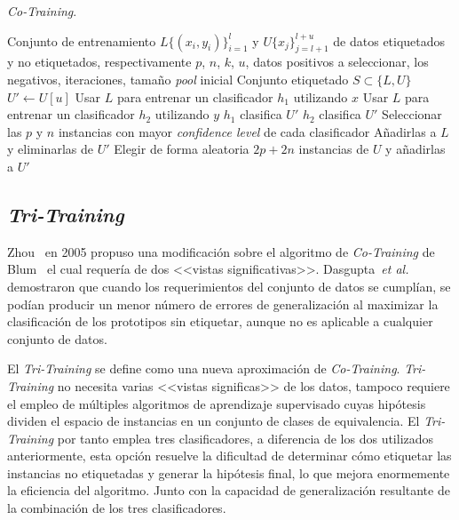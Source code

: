 \begin{algorithm}[H]
\caption{\textit{Co-Training}.}\label{alg:Co-Training}
\begin{algorithmic}[1]
\Require Conjunto de entrenamiento $L \lbrace\left(x_i, y_i\right)\rbrace_{i=1}^l$ y $U \lbrace x_j \rbrace_{j=l+1}^{l+u}$ de datos etiquetados y no etiquetados, respectivamente
\Require $p$, $n$, $k$, $u$, datos positivos a seleccionar, los negativos, iteraciones, tamaño \textit{pool} inicial
\Ensure Conjunto etiquetado $S \subset \lbrace L,U \rbrace$
\Statex
{}
	\State $U' \leftarrow U[u]$
		\State Usar $L$ para entrenar un clasificador $h_1$ utilizando $x$
		\State Usar $L$ para entrenar un clasificador $h_2$ utilizando $y$
		\State $h_1$ clasifica $U'$
		\State $h_2$ clasifica $U'$
		\State Seleccionar las $p$ y $n$ instancias con mayor \textit{confidence level} de cada clasificador
		\State Añadirlas a $L$ y eliminarlas de $U'$
		\State Elegir de forma aleatoria $2p+2n$ instancias de $U$ y añadirlas a $U'$
	\EndFor
\EndProcedure
\end{algorithmic}
\end{algorithm}

\subsection{\textit{Tri-Training}}
Zhou~\cite{zhou2005tri} en 2005 propuso una modificación sobre el algoritmo de \textit{Co-Training} de Blum~\cite{blum1998combining} el cual requería de dos <<vistas significativas>>. Dasgupta~\textit{et al.}~\cite{dasgupta2002pac} demostraron que cuando los requerimientos del conjunto de datos se cumplían, se podían producir un menor número de errores de generalización al maximizar la clasificación de los prototipos sin etiquetar, aunque no es aplicable a cualquier conjunto de datos.

El \textit{Tri-Training} se define como una nueva aproximación de \textit{Co-Training}. \textit{Tri-Training} no necesita varias <<vistas significas>> de los datos, tampoco requiere el empleo de múltiples algoritmos de aprendizaje supervisado cuyas hipótesis dividen el espacio de instancias en un conjunto de clases de equivalencia. El \textit{Tri-Training} por tanto emplea tres clasificadores, a diferencia de los dos utilizados anteriormente, esta opción resuelve la dificultad de determinar cómo etiquetar las instancias no etiquetadas y generar la hipótesis final, lo que mejora enormemente la eficiencia del algoritmo. Junto con la capacidad de generalización resultante de la combinación de los tres clasificadores.

